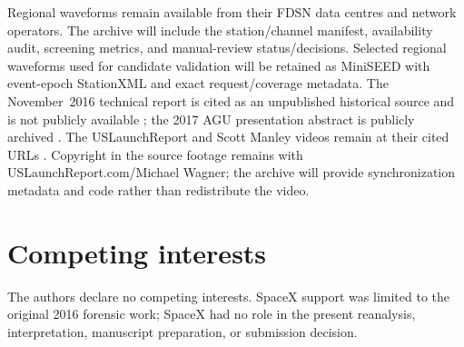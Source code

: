 \documentclass[]{seismica}
\begin{document}
Regional waveforms remain available from their FDSN data centres and network
operators. The archive will include the station/channel manifest, availability
audit, screening metrics, and manual-review status/decisions. Selected regional
waveforms used for candidate validation will be retained as MiniSEED with
event-epoch StationXML and exact request/coverage metadata. The November~2016
technical report is cited as an unpublished historical source and is not
publicly available \citep{thompson_mcnutt_fireball_2016}; the 2017 AGU
presentation abstract is publicly archived \citep{thompson_agu_falcon9_2017}. The USLaunchReport and
Scott Manley videos remain at their cited URLs
\citep{uslaunchreport_amos6_video_2016,manley_spacex_explosion_2016}. Copyright
in the source footage remains with USLaunchReport.com/Michael Wagner; the
archive will provide synchronization metadata and code rather than redistribute
the video.

\section*{Competing interests}

The authors declare no competing interests. SpaceX support was limited to the
original 2016 forensic work; SpaceX had no role in the present reanalysis,
interpretation, manuscript preparation, or submission decision.


\end{document}
